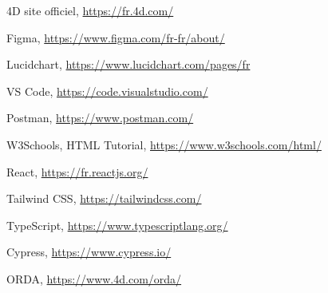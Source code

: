 
\begin{thebibliography}{9}
    
    4D site officiel,     
    \href{https://fr.4d.com/}{https://fr.4d.com/}
   
    Figma, 
    \href{https://www.figma.com/fr-fr/about/}{https://www.figma.com/fr-fr/about/}
    
    Lucidchart,
    \href{https://www.lucidchart.com/pages/fr}{https://www.lucidchart.com/pages/fr}
    
    VS Code,
    \href{https://code.visualstudio.com/}{https://code.visualstudio.com/}
    
    Postman,
    \href{https://www.postman.com/}{https://www.postman.com/}
    
    W3Schools, HTML Tutorial,
    \href{https://www.w3schools.com/html/}{https://www.w3schools.com/html/}
    
    React,
    \href{https://fr.reactjs.org/}{https://fr.reactjs.org/}
    
    Tailwind CSS,
    \href{https://tailwindcss.com/}{https://tailwindcss.com/}
    
    TypeScript,
    \href{https://www.typescriptlang.org/}{https://www.typescriptlang.org/}
    
    Cypress,
    \href{https://www.cypress.io/}{https://www.cypress.io/}
    
    ORDA,
    \href{https://www.4d.com/orda/}{https://www.4d.com/orda/}

    
\end{thebibliography}
